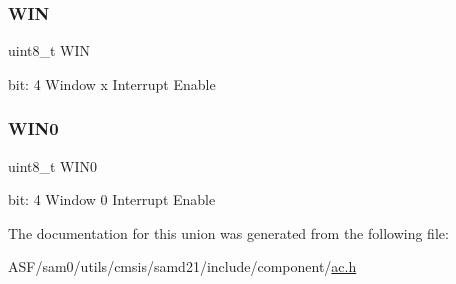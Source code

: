 \subsubsection{\texorpdfstring{WIN}{WIN}}
{\footnotesize\ttfamily uint8\+\_\+t W\+IN}

bit\+: 4 Window x Interrupt Enable \mbox{\label{union_a_c___i_n_t_e_n_s_e_t___type_ab1654ffd18d4bea08938666385d877ef}} 
\subsubsection{\texorpdfstring{WIN0}{WIN0}}
{\footnotesize\ttfamily uint8\+\_\+t W\+I\+N0}

bit\+: 4 Window 0 Interrupt Enable 

The documentation for this union was generated from the following file\+:\begin{DoxyCompactItemize}
\item 
A\+S\+F/sam0/utils/cmsis/samd21/include/component/\mbox{\hyperlink{component_2ac_8h}{ac.\+h}}\end{DoxyCompactItemize}
